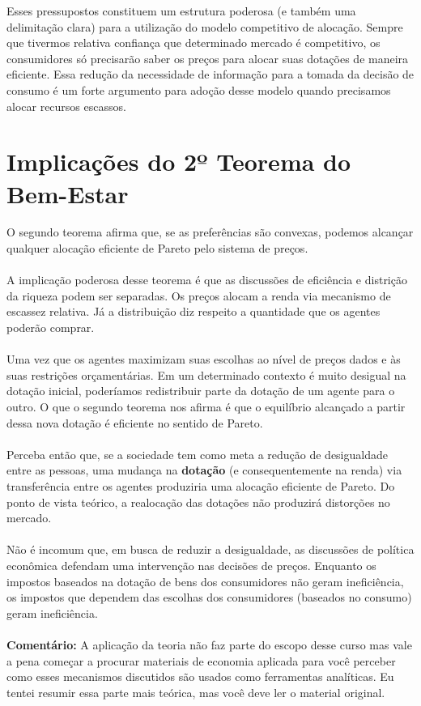 \documentclass[a4paper,11pt,oneside]{book}
\theoremstyle{definition}
\theoremstyle{break}
\begin{document}
Esses pressupostos constituem um estrutura poderosa (e também uma delimitação clara) para a utilização do modelo competitivo de alocação. Sempre que tivermos relativa confiança que determinado mercado é competitivo, os consumidores só precisarão saber os preços para alocar suas dotações de maneira eficiente. Essa redução da necessidade de informação para a tomada da decisão de consumo é um forte argumento para adoção desse modelo quando precisamos alocar recursos escassos.

\section{Implicações do 2º Teorema do Bem-Estar}

O segundo teorema afirma que, se as preferências são convexas, podemos alcançar qualquer alocação eficiente de Pareto pelo sistema de preços.
\\~\\
A implicação poderosa desse teorema é que as discussões de eficiência e distrição da riqueza podem ser separadas. Os preços alocam a renda via mecanismo de escassez relativa. Já a distribuição diz respeito a quantidade que os agentes poderão comprar.
\\~\\
Uma vez que os agentes maximizam suas escolhas ao nível de preços dados e às suas restrições orçamentárias. Em um determinado contexto é muito desigual na dotação inicial, poderíamos redistribuir parte da dotação de um agente para o outro. O que o segundo teorema nos afirma é que o equilíbrio alcançado a partir dessa nova dotação é eficiente no sentido de Pareto.
\\~\\
Perceba então que, se a sociedade tem como meta a redução de desigualdade entre as pessoas, uma mudança na \textbf{dotação} (e consequentemente na renda) via transferência entre os agentes produziria uma alocação eficiente de Pareto. Do ponto  de vista teórico, a realocação das dotações não produzirá distorções no mercado.
\\~\\
Não é incomum que, em busca de reduzir a desigualdade, as discussões de política econômica defendam uma intervenção nas decisões de preços. Enquanto os impostos baseados na dotação de bens dos consumidores não geram ineficiência, os impostos que dependem das escolhas dos consumidores (baseados no consumo) geram ineficiência.
\\~\\
\textbf{Comentário:} A aplicação da teoria não faz parte do escopo desse curso mas vale a pena começar a procurar materiais de economia aplicada para você perceber como esses mecanismos discutidos são usados como ferramentas analíticas. Eu tentei resumir essa parte mais teórica, mas você deve ler o material original.
\end{document}

